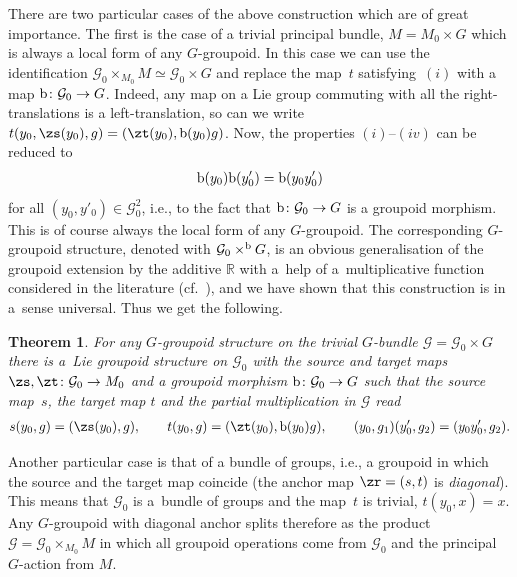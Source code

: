 \documentclass[10pt,a4paper]{amsart}
\newcommand{\rmb}{\textnormal{b}}
\newcommand{\R}{{\mathbb R}}
\newcommand{\ti}{\times}
\def\cG{\mathcal{G}}
\numberwithin{equation}{section}
\newtheorem{Theorem}{Theorem}[section]
\begin{document}
There are two particular cases of the above construction which are of great importance. The f\/irst is the case of a trivial principal bundle, $M=M_0\ti G$ which is always a local form of any $G$-groupoid. In this case we can use the identif\/ication $\cG_0\times_{M_0}M\simeq\cG_0\times G$ and replace the map~$t$ satisfying~$(i)$ with a map $\rmb\colon \cG_0\to G$. Indeed, any map on a Lie group commuting with all the right-translations is a left-translation, so can we write $t(y_0,\zs(y_0),g)=(\zt(y_0),\rmb(y_0)g)$. Now, the properties $(i)$--$(iv)$ can be reduced to
\begin{gather*}%
\rmb(y_0)\rmb(y'_0)=\rmb(y_0y'_0)
\end{gather*}
for all $(y_0,y'_0)\in\cG_0^2$, i.e., to the fact that $\rmb\colon \cG_0\to G$ is a groupoid morphism. This is of course always the local form of any $G$-groupoid. The corresponding $G$-groupoid structure, denoted with $\cG_0\ti^\rmb G$, is an obvious generalisation of the groupoid extension by the additive $\R$ with a~help of a~multiplicative function considered in the literature (cf.~\cite[Def\/inition~2.3]{Crainic:2007}), and we have shown that this construction is in a~sense universal. Thus we get the following.
\begin{Theorem}\label{trivialsplit} For any $G$-groupoid structure on the trivial $G$-bundle $\cG=\cG_0\ti G$ there is a~Lie groupoid structure on $\cG_0$ with the source and target maps $\zs,\zt\colon \cG_0\to M_0$ and a groupoid morphism $\rmb\colon \cG_0\to G$ such that the source map~$s$, the target map $t$ and the partial multiplication in $\cG$ read
\begin{gather*}s(y_0,g)=(\zs(y_0), g),\qquad t(y_0,g)=(\zt(y_0),\rmb(y_0)g),\qquad (y_0,g_1)(y'_0,g_2)=(y_0y'_0,g_2).
\end{gather*}
\end{Theorem}

Another particular case is that of a bundle of groups, i.e., a groupoid in which the source and the target map coincide (the anchor map $\zr=(s,t)$ is \emph{diagonal}). This means that $\cG_0$ is a~bundle of groups and the map~$t$ is trivial, $t(y_0,x)=x$. Any $G$-groupoid with diagonal anchor splits therefore as the product $\cG=\cG_0\times_{M_0}M$ in which all groupoid operations come from $\cG_0$ and the principal $G$-action from $M$.
\end{document}
